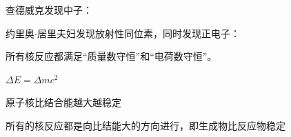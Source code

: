 	查德威克发现中子：

	约里奥\(\cdot\)居里夫妇发现放射性同位素，同时发现正电子：

	\qquad{}

	
	所有核反应都满足“质量数守恒”和“电荷数守恒”。


	\(\Delta E = \Delta mc^2\)


	原子核比结合能越大越稳定

	所有的核反应都是向比结能大的方向进行，即生成物比反应物稳定
